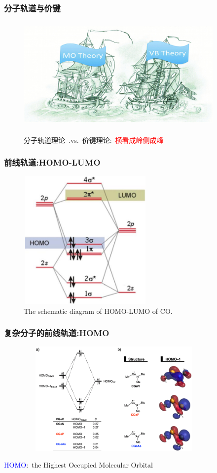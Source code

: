 \frame
{
	\frametitle{分子轨道与价键}
\begin{figure}[h!]
\centering
\vspace{-5.5pt}
\includegraphics[height=2.20in,width=4.00in,viewport=0 0 430 220,clip]{Figures/VB-vs-MO.jpg}
\label{VB-vs-MO}
\caption{分子轨道理论\textrm{~.vs.~}价键理论:~\textcolor{red}{横看成岭侧成峰}}
\end{figure}
}


\frame
{
	\frametitle{前线轨道:\textrm{HOMO-LUMO}}
\begin{figure}[h!]
\centering
\vspace{-10.5pt}
\includegraphics[height=2.70in,width=2.60in,viewport=0 0 550 583,clip]{Figures/HOMO-LUMO-CO.png}
\caption{\textrm{The schematic diagram of HOMO-LUMO of CO.}}
\label{HOMO-LUMO-CO}
\end{figure}
}

\frame
{
	\frametitle{复杂分子的前线轨道:\textrm{HOMO}}
\begin{figure}[h!]
\centering
\vspace{-10.5pt}
\includegraphics[height=2.20in,width=3.80in,viewport=0 0 900 570,clip]{Figures/Molecular-orbital-diagram-of-the-most-important-occupied-occupied-orbital-overlap_2.png}
\label{HOMO-LUMO:HOMO}
\end{figure}
\textrm{\textcolor{blue}{HOMO}:~the Highest Occupied Molecular Orbital}
}

